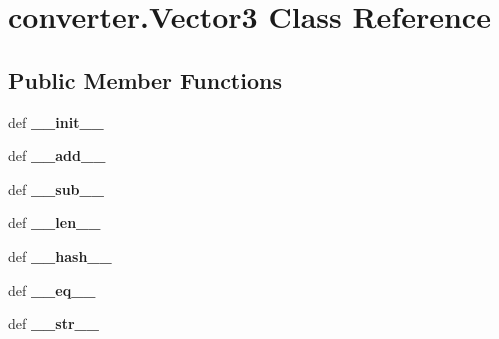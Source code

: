 \hypertarget{classconverter_1_1Vector3}{\section{converter.\-Vector3 Class Reference}
\label{classconverter_1_1Vector3}
}
\subsection*{Public Member Functions}
\begin{DoxyCompactItemize}
\item 
\hypertarget{classconverter_1_1Vector3_a5931a4fd68828c765b5f1217fa684118}{def {\bfseries \-\_\-\-\_\-init\-\_\-\-\_\-}}\label{classconverter_1_1Vector3_a5931a4fd68828c765b5f1217fa684118}

\item 
\hypertarget{classconverter_1_1Vector3_a009efbe2b2521b182b710f0e0689e90e}{def {\bfseries \-\_\-\-\_\-add\-\_\-\-\_\-}}\label{classconverter_1_1Vector3_a009efbe2b2521b182b710f0e0689e90e}

\item 
\hypertarget{classconverter_1_1Vector3_a59d25150eecfc11af710f8d43395a7db}{def {\bfseries \-\_\-\-\_\-sub\-\_\-\-\_\-}}\label{classconverter_1_1Vector3_a59d25150eecfc11af710f8d43395a7db}

\item 
\hypertarget{classconverter_1_1Vector3_a2e5c8a31d0f5cb67788180db557a7a5a}{def {\bfseries \-\_\-\-\_\-len\-\_\-\-\_\-}}\label{classconverter_1_1Vector3_a2e5c8a31d0f5cb67788180db557a7a5a}

\item 
\hypertarget{classconverter_1_1Vector3_a8c52c1efad2a08969305619a9e474981}{def {\bfseries \-\_\-\-\_\-hash\-\_\-\-\_\-}}\label{classconverter_1_1Vector3_a8c52c1efad2a08969305619a9e474981}

\item 
\hypertarget{classconverter_1_1Vector3_a5cb27aa26203cbc94374adc68f089f86}{def {\bfseries \-\_\-\-\_\-eq\-\_\-\-\_\-}}\label{classconverter_1_1Vector3_a5cb27aa26203cbc94374adc68f089f86}

\item 
\hypertarget{classconverter_1_1Vector3_af077fac2caaf753db4d2a761c2f6fb57}{def {\bfseries \-\_\-\-\_\-str\-\_\-\-\_\-}}\label{classconverter_1_1Vector3_af077fac2caaf753db4d2a761c2f6fb57}

\end{DoxyCompactItemize}
